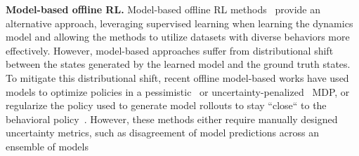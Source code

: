 \textbf{Model-based offline RL.} Model-based offline RL methods~\citep{finn2017deep, ebert2018visual, kahn2018composable, kidambi2020morel, yu2020mopo, matsushima2020deployment, argenson2020model, swazinna2020overcoming,Rafailov2020LOMPO, lee2021representation} provide an alternative approach, leveraging supervised learning when learning the dynamics model and allowing the methods to utilize datasets with diverse behaviors more effectively.
However, model-based approaches suffer from distributional shift between the states generated by the learned model and the ground truth states. To mitigate this distributional shift, recent offline model-based works have used models to optimize policies in a pessimistic~\citep{kidambi2020morel} or uncertainty-penalized~\citep{yu2020mopo, Rafailov2020LOMPO, lee2021representation} MDP, or regularize the policy used to generate model rollouts to stay ``close`` to the behavioral policy~\citep{matsushima2020deployment, swazinna2020overcoming}. However, these methods either require manually designed uncertainty metrics, such as disagreement of model predictions across an ensemble of models~\citep{chua2018deep}
